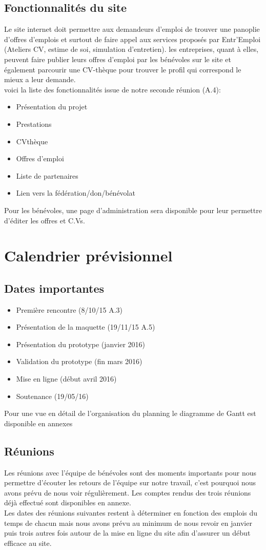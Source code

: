 \documentclass[a4paper, 12pt]{report}
\begin{document}
\section{Fonctionnalités du site}
Le site internet doit permettre aux demandeurs d'emploi de trouver une panoplie d'offres d'emplois et surtout de faire
appel aux services proposés par Entr'Emploi (Ateliers CV, estime de soi, simulation d'entretien).
les entreprises, quant à elles, peuvent faire publier leurs offres d'emploi par les bénévoles sur le site et également
parcourir une CV-thèque pour trouver le profil qui correspond le mieux a leur demande.\\
voici la liste des fonctionnalités issue de notre seconde réunion (A.4):
\begin{itemize}
    \item Présentation du projet
    \item Prestations
    \item CVthèque
    \item Offres d'emploi
    \item Liste de partenaires
    \item Lien vers la fédération/don/bénévolat
\end{itemize}
Pour les bénévoles, une page d'administration sera disponible pour leur permettre d'éditer les offres et C.Vs.

\chapter{Calendrier prévisionnel}
\thispagestyle{fancy}
\section{Dates importantes}
\begin{itemize}
\item Première rencontre (8/10/15 A.3)
\item Présentation de la maquette (19/11/15 A.5)
\item Présentation du prototype (janvier 2016)
\item Validation du prototype (fin mars 2016)
\item Mise en ligne (début avril 2016)
\item Soutenance (19/05/16)
\end{itemize}
Pour une vue en détail de l'organisation du planning le diagramme de Gantt est disponible en annexes
\section{Réunions}
Les réunions avec l'équipe de bénévoles sont des moments importants pour nous permettre d'écouter les retours de l'équipe sur notre travail, c'est pourquoi nous avons prévu de nous voir régulièrement. Les comptes rendus des trois réunions déjà effectué sont disponibles en annexe.\\
Les dates des réunions suivantes restent à déterminer en fonction des emplois du temps de chacun mais nous avons prévu au minimum de nous revoir en janvier puis trois autres fois autour de la mise en ligne du site afin d'assurer un début efficace au site.
\end{document}
